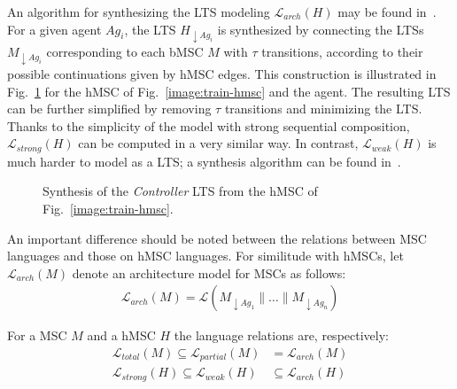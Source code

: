 An algorithm for synthesizing the LTS modeling $\mathcal{L}_{arch}(H)$ may be found in~\cite{Uchitel:2004}. For a given agent $Ag_{i}$, the LTS $H_{\downarrow Ag_i}$ is synthesized by connecting the LTSs $M_{\downarrow Ag_i}$ corresponding to each bMSC $M$ with $\tau$ transitions, according to their possible continuations given by hMSC edges. This construction is illustrated in Fig.~\ref{image:train-controller-synthesis} for the hMSC of Fig.~\ref{image:train-hmsc} and the  agent. The resulting LTS can be further simplified by removing $\tau$ transitions and minimizing the LTS.  Thanks to the simplicity of the model with strong sequential composition, $\mathcal{L}_{strong}(H)$ can be computed in a very similar way. In contrast, $\mathcal{L}_{weak}(H)$ is much harder to model as a LTS; a synthesis algorithm can be found in~\cite{Uchitel:2004}.

\vspace{0.4cm}
\begin{figure}[H]\centering
{}
\caption{Synthesis of the \emph{Controller} LTS from the hMSC of Fig.~\ref{image:train-hmsc}.\label{image:train-controller-synthesis}}
\end{figure}

An important difference should be noted between the relations between MSC languages and those on hMSC languages. For similitude with hMSCs, let $\mathcal{L}_{arch}(M)$ denote an architecture model for MSCs as follows:
\begin{align}
\mathcal{L}_{arch}(M) = \mathcal{L}(M_{\downarrow Ag_1}\parallel\ldots\parallel M_{\downarrow Ag_n})
\end{align}

\noindent For a MSC $M$ and a hMSC $H$ the language relations are, respectively:
\begin{align}
\mathcal{L}_{total}(M) \subseteq \mathcal{L}_{partial}(M) &= \mathcal{L}_{arch}(M)\\
\mathcal{L}_{strong}(H) \subseteq \mathcal{L}_{weak}(H) &\subseteq \mathcal{L}_{arch}(H)
\end{align}

